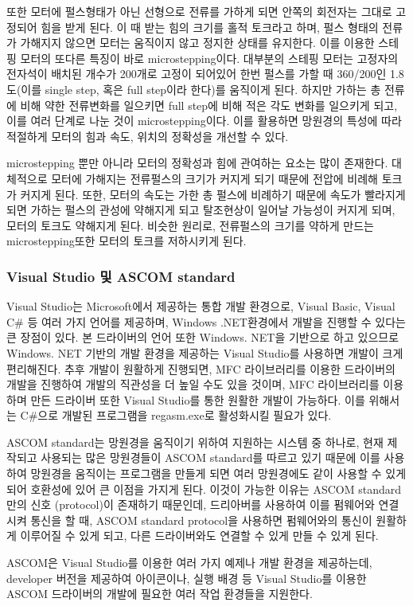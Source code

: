 또한 모터에 펄스형태가 아닌 선형으로 전류를 가하게 되면 안쪽의 회전자는 그대로 고정되어 힘을 받게 된다. 이 때 받는 힘의 크기를 홀적 토크라고 하며, 펄스 형태의 전류가 가해지지 않으면 모터는 움직이지 않고 정지한 상태를 유지한다. 이를 이용한 스테핑 모터의 또다른 특징이 바로 microstepping이다. 대부분의 스테핑 모터는 고정자의 전자석이 배치된 개수가 200개로 고정이 되어있어 한번 펄스를 가할 때 360/200인 1.8도(이를 single step, 혹은 full step이라 한다)를 움직이게 된다. 하지만 가하는 총 전류에 비해 약한 전류변화를 일으키면 full step에 비해 적은 각도 변화를 일으키게 되고, 이를 여러 단계로 나눈 것이 microstepping이다. 이를 활용하면 망원경의 특성에 따라 적절하게 모터의 힘과 속도, 위치의 정확성을 개선할 수 있다.

microstepping 뿐만 아니라 모터의 정확성과 힘에 관여하는 요소는 많이 존재한다. 대체적으로  모터에 가해지는 전류펄스의 크기가 커지게 되기 때문에 전압에 비례해 토크가 커지게 된다. 또한, 모터의 속도는 가한 총 펄스에 비례하기 때문에 속도가 빨라지게 되면 가하는 펄스의 관성에 약해지게 되고 탈조현상이 일어날 가능성이 커지게 되며, 모터의 토크도 약해지게 된다. 비슷한 원리로, 전류펄스의 크기를 약하게 만드는 microstepping또한 모터의 토크를 저하시키게 된다.

\subsubsection{Visual Studio 및 ASCOM standard}
Visual Studio는 Microsoft에서 제공하는 통합 개발 환경으로, Visual Basic, Visual C\# 등 여러 가지 언어를 제공하며, Windows .NET환경에서 개발을 진행할 수 있다는 큰 장점이 있다. 본 드라이버의 언어 또한 Windows. NET을 기반으로 하고 있으므로 Windows. NET 기반의 개발 환경을 제공하는 Visual Studio를 사용하면 개발이 크게 편리해진다. 추후 개발이 원활하게 진행되면, MFC 라이브러리를 이용한 드라이버의 개발을 진행하여 개발의 직관성을 더 높일 수도 있을 것이며, MFC 라이브러리를 이용하며 만든 드라이버 또한 Visual Studio를 통한 원활한 개발이 가능하다. 이를 위해서는 C\#으로 개발된 프로그램을 regasm.exe로 활성화시킬 필요가 있다.

ASCOM standard는 망원경을 움직이기 위하여 지원하는 시스템 중 하나로, 현재 제작되고 사용되는 많은 망원경들이 ASCOM standard를 따르고 있기 때문에 이를 사용하여 망원경을 움직이는 프로그램을 만들게 되면 여러 망원경에도 같이 사용할 수 있게 되어 호환성에 있어 큰 이점을 가지게 된다. 이것이 가능한 이유는 ASCOM standard 만의 신호 (protocol)이 존재하기 때문인데, 드리아버를 사용하여 이를 펌웨어와 연결시켜 통신을 할 때, ASCOM standard protocol을 사용하면 펌웨어와의 통신이 원활하게 이루어질 수 있게 되고, 다른 드라이버와도 연결할 수 있게 만들 수 있게 된다.

ASCOM은 Visual Studio를 이용한 여러 가지 예제나 개발 환경을 제공하는데, developer 버전을 제공하여 아이콘이나, 실행 배경 등 Visual Studio를 이용한 ASCOM 드라이버의 개발에 필요한 여러 작업 환경들을 지원한다.
